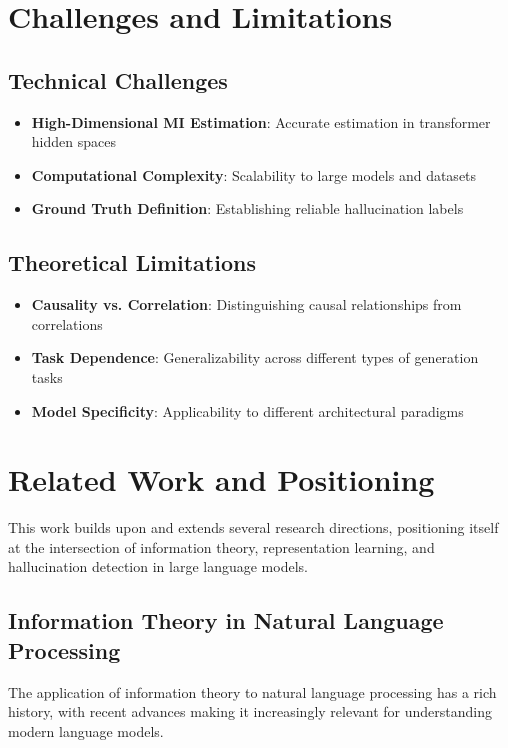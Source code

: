 \section{Challenges and Limitations}
\label{sec:challenges}

\subsection{Technical Challenges}
\begin{itemize}
    \item \textbf{High-Dimensional MI Estimation}: Accurate estimation in transformer hidden spaces
    \item \textbf{Computational Complexity}: Scalability to large models and datasets
    \item \textbf{Ground Truth Definition}: Establishing reliable hallucination labels
\end{itemize}

\subsection{Theoretical Limitations}
\begin{itemize}
    \item \textbf{Causality vs. Correlation}: Distinguishing causal relationships from correlations
    \item \textbf{Task Dependence}: Generalizability across different types of generation tasks
    \item \textbf{Model Specificity}: Applicability to different architectural paradigms
\end{itemize}



\section{Related Work and Positioning}
\label{sec:related_work}

This work builds upon and extends several research directions, positioning itself at the intersection of information theory, representation learning, and hallucination detection in large language models.

\subsection{Information Theory in Natural Language Processing}
\label{subsec:info_theory_nlp}

The application of information theory to natural language processing has a rich history, with recent advances making it increasingly relevant for understanding modern language models.

